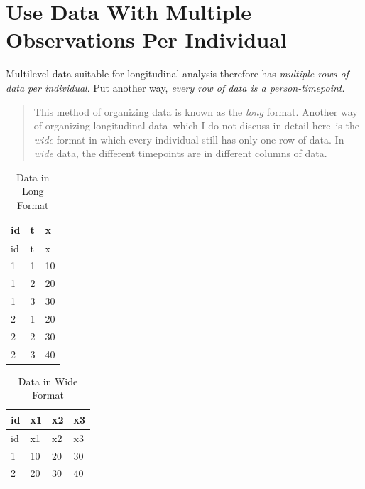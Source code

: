 \documentclass[
  letterpaper,
  DIV=11,
  numbers=noendperiod]{scrreprt}
\begin{document}
\hypertarget{use-data-with-multiple-observations-per-individual}{%
\section{Use Data With Multiple Observations Per
Individual}\label{use-data-with-multiple-observations-per-individual}}

Multilevel data suitable for longitudinal analysis therefore has
\emph{multiple rows of data per individual}. Put another way,
\emph{every row of data is a person-timepoint}.

\begin{quote}
This method of organizing data is known as the \emph{long} format.
Another way of organizing longitudinal data--which I do not discuss in
detail here--is the \emph{wide} format in which every individual still
has only one row of data. In \emph{wide} data, the different timepoints
are in different columns of data.
\end{quote}

\hypertarget{tbl-datalong}{}
\begin{longtable}[]{@{}lll@{}}
\caption{\label{tbl-datalong}Data in Long Format}\tabularnewline
\toprule()
id & t & x \\
\midrule()
\endfirsthead
\toprule()
id & t & x \\
\midrule()
\endhead
1 & 1 & 10 \\
1 & 2 & 20 \\
1 & 3 & 30 \\
2 & 1 & 20 \\
2 & 2 & 30 \\
2 & 3 & 40 \\
\bottomrule()
\end{longtable}

\hypertarget{tbl-datawide}{}
\begin{longtable}[]{@{}llll@{}}
\caption{\label{tbl-datawide}Data in Wide Format}\tabularnewline
\toprule()
id & x1 & x2 & x3 \\
\midrule()
\endfirsthead
\toprule()
id & x1 & x2 & x3 \\
\midrule()
\endhead
1 & 10 & 20 & 30 \\
2 & 20 & 30 & 40 \\
\bottomrule()
\end{longtable}
\end{document}
